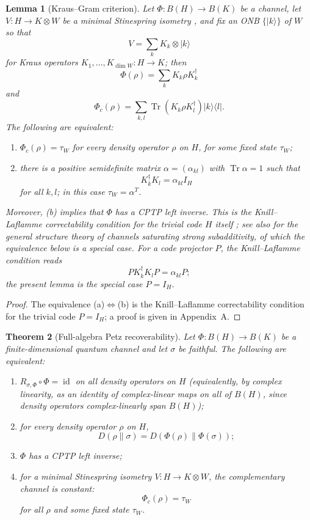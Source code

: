 \documentclass[11pt]{article}
\newtheorem{theorem}{Theorem}[section]
\newtheorem{lemma}[theorem]{Lemma}
\DeclareMathOperator{\Tr}{Tr}
\DeclareMathOperator{\id}{id}
\begin{document}
\begin{lemma}[Kraus--Gram criterion]
\label{lem:kraus-gram}
Let $\Phi:B(H)\to B(K)$ be a channel, let $V:H\to K\otimes W$ be a minimal
Stinespring isometry \cite{Stinespring1955}, and fix an ONB
$\{|k\rangle\}$ of $W$ so that
\[
V=\sum_k K_k\otimes|k\rangle
\]
for Kraus operators $K_1,\dots,K_{\dim W}:H\to K$; then
\[
\Phi(\rho)=\sum_k K_k\rho K_k^\dagger
\]
and
\[
\Phi_c(\rho)=\sum_{k,l}\Tr(K_k\rho K_l^\dagger)|k\rangle\langle l|.
\]
The following are equivalent:
\begin{enumerate}
\item[(a)] $\Phi_c(\rho)=\tau_W$ for every density operator $\rho$ on $H$,
for some fixed state $\tau_W$;
\item[(b)] there is a positive semidefinite matrix
$\alpha=(\alpha_{kl})$ with $\Tr\alpha=1$ such that
\[
K_k^\dagger K_l=\alpha_{kl}I_H
\]
for all $k,l$; in this case $\tau_W=\alpha^T$.
\end{enumerate}
Moreover, (b) implies that $\Phi$ has a CPTP left inverse. This is the
Knill--Laflamme correctability condition for the trivial code $H$ itself
\cite{KnillLaflamme1997}; see also \cite{HaydenJozsaPetzWinter2004} for the
general structure theory of channels saturating strong subadditivity, of
which the equivalence below is a special case. For a code projector $P$,
the Knill--Laflamme condition reads
\[
P K_k^\dagger K_l P=\alpha_{kl}P;
\]
the present lemma is the special case $P=I_H$.
\end{lemma}

\begin{proof}
The equivalence (a)$\Leftrightarrow$(b) is the Knill--Laflamme
correctability condition \cite{KnillLaflamme1997} for the trivial code
$P=I_H$; a proof is given in Appendix~A.
\end{proof}

\begin{theorem}[Full-algebra Petz recoverability]
\label{thm:petz-full}
Let $\Phi:B(H)\to B(K)$ be a finite-dimensional quantum channel and let
$\sigma$ be faithful. The following are equivalent:
\begin{enumerate}
\item $R_{\sigma,\Phi}\circ\Phi=\id$ on all density operators on $H$
(equivalently, by complex linearity, as an identity of complex-linear maps
on all of $B(H)$, since density operators complex-linearly span $B(H)$);
\item for every density operator $\rho$ on $H$,
\[
D(\rho\|\sigma)=D(\Phi(\rho)\|\Phi(\sigma));
\]
\item $\Phi$ has a CPTP left inverse;
\item for a minimal Stinespring isometry $V:H\to K\otimes W$, the
complementary channel is constant:
\[
\Phi_c(\rho)=\tau_W
\]
for all $\rho$ and some fixed state $\tau_W$.
\end{enumerate}
\end{theorem}
\end{document}
